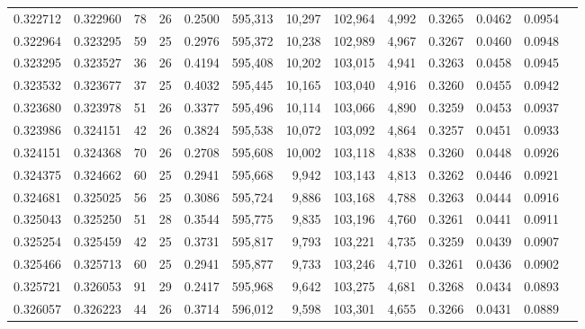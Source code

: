 \begin{tabular}{rrrrrrrrrrrrr}
0.322712 & 0.322960 &  78 &  26 &                                     0.2500 & 595,313 &  10,297 & 102,964 &   4,992 & 0.3265 & 0.0462 & 0.0954 \\
0.322964 & 0.323295 &  59 &  25 &                                     0.2976 & 595,372 &  10,238 & 102,989 &   4,967 & 0.3267 & 0.0460 & 0.0948 \\
0.323295 & 0.323527 &  36 &  26 &                                     0.4194 & 595,408 &  10,202 & 103,015 &   4,941 & 0.3263 & 0.0458 & 0.0945 \\
0.323532 & 0.323677 &  37 &  25 &                                     0.4032 & 595,445 &  10,165 & 103,040 &   4,916 & 0.3260 & 0.0455 & 0.0942 \\
0.323680 & 0.323978 &  51 &  26 &                                     0.3377 & 595,496 &  10,114 & 103,066 &   4,890 & 0.3259 & 0.0453 & 0.0937 \\
0.323986 & 0.324151 &  42 &  26 &                                     0.3824 & 595,538 &  10,072 & 103,092 &   4,864 & 0.3257 & 0.0451 & 0.0933 \\
0.324151 & 0.324368 &  70 &  26 &                                     0.2708 & 595,608 &  10,002 & 103,118 &   4,838 & 0.3260 & 0.0448 & 0.0926 \\
0.324375 & 0.324662 &  60 &  25 &                                     0.2941 & 595,668 &   9,942 & 103,143 &   4,813 & 0.3262 & 0.0446 & 0.0921 \\
0.324681 & 0.325025 &  56 &  25 &                                     0.3086 & 595,724 &   9,886 & 103,168 &   4,788 & 0.3263 & 0.0444 & 0.0916 \\
0.325043 & 0.325250 &  51 &  28 &                                     0.3544 & 595,775 &   9,835 & 103,196 &   4,760 & 0.3261 & 0.0441 & 0.0911 \\
0.325254 & 0.325459 &  42 &  25 &                                     0.3731 & 595,817 &   9,793 & 103,221 &   4,735 & 0.3259 & 0.0439 & 0.0907 \\
0.325466 & 0.325713 &  60 &  25 &                                     0.2941 & 595,877 &   9,733 & 103,246 &   4,710 & 0.3261 & 0.0436 & 0.0902 \\
0.325721 & 0.326053 &  91 &  29 &                                     0.2417 & 595,968 &   9,642 & 103,275 &   4,681 & 0.3268 & 0.0434 & 0.0893 \\
0.326057 & 0.326223 &  44 &  26 &                                     0.3714 & 596,012 &   9,598 & 103,301 &   4,655 & 0.3266 & 0.0431 & 0.0889 \\

\end{tabular}
